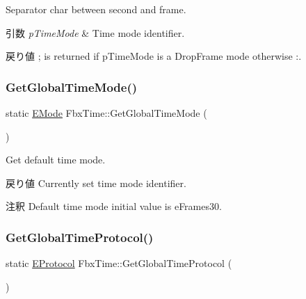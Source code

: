 Separator char between second and frame. 
\begin{DoxyParams}{引数}
{\em p\+Time\+Mode} & Time mode identifier. \\
\hline
\end{DoxyParams}
\begin{DoxyReturn}{戻り値}
\textquotesingle{};\textquotesingle{} is returned if p\+Time\+Mode is a Drop\+Frame mode otherwise \textquotesingle{}\+:\textquotesingle{}. 
\end{DoxyReturn}
\mbox{\label{class_fbx_time_ae5ad30ea14f534b93fb04c2966ef5ae7}} 
\subsubsection{\texorpdfstring{Get\+Global\+Time\+Mode()}{GetGlobalTimeMode()}}
{\footnotesize\ttfamily static \hyperlink{class_fbx_time_acc529b00a0e8d4c3da3702449ca93031}{E\+Mode} Fbx\+Time\+::\+Get\+Global\+Time\+Mode (\begin{DoxyParamCaption}{ }\end{DoxyParamCaption})\hspace{0.3cm}{\ttfamily [static]}}

Get default time mode. \begin{DoxyReturn}{戻り値}
Currently set time mode identifier. 
\end{DoxyReturn}
\begin{DoxyRemark}{注釈}
Default time mode initial value is e\+Frames30. 
\end{DoxyRemark}
\mbox{\label{class_fbx_time_af50c9f37b415366a30a62378d0fd9e0f}} 
\subsubsection{\texorpdfstring{Get\+Global\+Time\+Protocol()}{GetGlobalTimeProtocol()}}
{\footnotesize\ttfamily static \hyperlink{class_fbx_time_a10ffa1fdce0aa7f63ec24bdd23afff4b}{E\+Protocol} Fbx\+Time\+::\+Get\+Global\+Time\+Protocol (\begin{DoxyParamCaption}{ }\end{DoxyParamCaption})\hspace{0.3cm}{\ttfamily [static]}}

